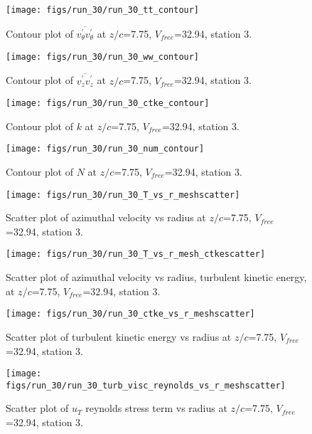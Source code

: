 \begin{figure}[H]
\centering
\texttt{[image: figs/run\_30/run\_30\_tt\_contour]}
\caption{Contour plot of $\overline{v_{\theta}^{\prime} v_{\theta}^{\prime}}$ at $z/c$=7.75, $V_{free}$=32.94, station 3.}
\end{figure}


\begin{figure}[H]
\centering
\texttt{[image: figs/run\_30/run\_30\_ww\_contour]}
\caption{Contour plot of $\overline{v_{z}^{\prime} v_{z}^{\prime}}$ at $z/c$=7.75, $V_{free}$=32.94, station 3.}
\end{figure}


\begin{figure}[H]
\centering
\texttt{[image: figs/run\_30/run\_30\_ctke\_contour]}
\caption{Contour plot of $k$ at $z/c$=7.75, $V_{free}$=32.94, station 3.}
\end{figure}


\begin{figure}[H]
\centering
\texttt{[image: figs/run\_30/run\_30\_num\_contour]}
\caption{Contour plot of $N$ at $z/c$=7.75, $V_{free}$=32.94, station 3.}
\end{figure}


\begin{figure}[H]
\centering
\texttt{[image: figs/run\_30/run\_30\_T\_vs\_r\_meshscatter]}
\caption{Scatter plot of azimuthal velocity vs radius at $z/c$=7.75, $V_{free}$=32.94, station 3.}
\end{figure}


\begin{figure}[H]
\centering
\texttt{[image: figs/run\_30/run\_30\_T\_vs\_r\_mesh\_ctkescatter]}
\caption{Scatter plot of azimuthal velocity vs radius, turbulent kinetic energy, at $z/c$=7.75, $V_{free}$=32.94, station 3.}
\end{figure}


\begin{figure}[H]
\centering
\texttt{[image: figs/run\_30/run\_30\_ctke\_vs\_r\_meshscatter]}
\caption{Scatter plot of turbulent kinetic energy vs radius at $z/c$=7.75, $V_{free}$=32.94, station 3.}
\end{figure}


\begin{figure}[H]
\centering
\texttt{[image: figs/run\_30/run\_30\_turb\_visc\_reynolds\_vs\_r\_meshscatter]}
\caption{Scatter plot of $
u_T$ reynolds stress term vs radius at $z/c$=7.75, $V_{free}$=32.94, station 3.}
\end{figure}


